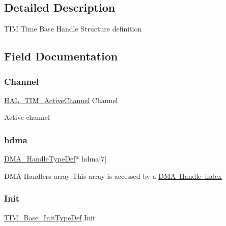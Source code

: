 \subsection{Detailed Description}
T\+IM Time Base Handle Structure definition ~\newline
 

\subsection{Field Documentation}
\mbox{\label{struct_t_i_m___handle_type_def_a57eac61d1d06cad73bdd26dabe961753}} 
\subsubsection{\texorpdfstring{Channel}{Channel}}
{\footnotesize\ttfamily \mbox{\hyperlink{group___t_i_m___exported___types_gaa3fa7bcbb4707f1151ccfc90a8cf9706}{H\+A\+L\+\_\+\+T\+I\+M\+\_\+\+Active\+Channel}} Channel}

Active channel \mbox{\label{struct_t_i_m___handle_type_def_ac129fca4918fc510a515d89370aa9006}} 
\subsubsection{\texorpdfstring{hdma}{hdma}}
{\footnotesize\ttfamily \mbox{\hyperlink{group___d_m_a___exported___types_ga41b754a906b86bce54dc79938970138b}{D\+M\+A\+\_\+\+Handle\+Type\+Def}}$\ast$ hdma\mbox{[}7\mbox{]}}

D\+MA Handlers array This array is accessed by a \mbox{\hyperlink{group___d_m_a___handle__index}{D\+MA Handle index}} \mbox{\label{struct_t_i_m___handle_type_def_a21046dd4833b51c8e3f5c82ea134d03c}} 
\subsubsection{\texorpdfstring{Init}{Init}}
{\footnotesize\ttfamily \mbox{\hyperlink{struct_t_i_m___base___init_type_def}{T\+I\+M\+\_\+\+Base\+\_\+\+Init\+Type\+Def}} Init}

